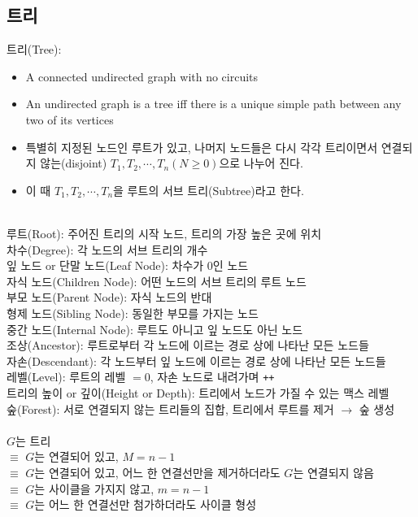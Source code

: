 \subsection{트리}
트리(Tree):
\begin{itemize}
    \item A connected undirected graph with no circuits
    \item An undirected graph is a tree iff there is a unique simple path between any two of its vertices
    \item 특별히 지정된 노드인 루트가 있고, 나머지 노드들은 다시 각각 트리이면서 연결되지 않는(disjoint) $T_1, T_2, \cdots, T_n(N \geq 0)$으로 나누어 진다.
    \item 이 때 $T_1, T_2, \cdots, T_n$을 루트의 서브 트리(Subtree)라고 한다.
\end{itemize}\phantom{}
\\
루트(Root): 주어진 트리의 시작 노드, 트리의 가장 높은 곳에 위치\\
차수(Degree): 각 노드의 서브 트리의 개수\\
잎 노드 or 단말 노드(Leaf Node): 차수가 0인 노드\\
자식 노드(Children Node): 어떤 노드의 서브 트리의 루트 노드\\
부모 노드(Parent Node): 자식 노드의 반대\\
형제 노드(Sibling Node): 동일한 부모를 가지는 노드\\
중간 노드(Internal Node): 루트도 아니고 잎 노드도 아닌 노드\\
조상(Ancestor): 루트로부터 각 노드에 이르는 경로 상에 나타난 모든 노드들\\
자손(Descendant): 각 노드부터 잎 노드에 이르는 경로 상에 나타난 모든 노드들\\
레벨(Level): 루트의 레벨 $= 0$, 자손 노드로 내려가며 \texttt{++}\\
트리의 높이 or 깊이(Height or Depth): 트리에서 노드가 가질 수 있는 맥스 레벨\\
숲(Forest): 서로 연결되지 않는 트리들의 집합, 트리에서 루트를 제거 $\to$ 숲 생성
\\\\
$G$는 트리\\
$\equiv$ $G$는 연결되어 있고, $M = n - 1$\\
$\equiv$ $G$는 연결되어 있고, 어느 한 연결선만을 제거하더라도 $G$는 연결되지 않음\\
$\equiv$ $G$는 사이클을 가지지 않고, $m = n - 1$\\
$\equiv$ $G$는 어느 한 연결선만 첨가하더라도 사이클 형성\\

